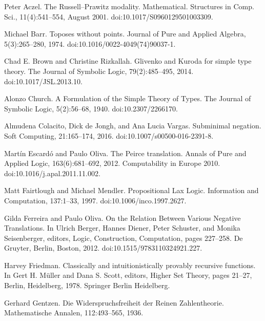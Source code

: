 \documentclass[10pt,a4paper]{article}
\begin{document}
\par\noindent  [1]  Peter Aczel.  The Russell–Prawitz modality.  Mathematical. Structures in Comp. Sci., 11(4):541–554, August 2001.  doi:10.1017/S0960129501003309.  
 
\par\noindent  [2]  Michael Barr.  Toposes without points.  Journal of Pure and Applied Algebra, 5(3):265–280, 1974.  doi:10.1016/0022-4049(74)90037-1.  
 
\par\noindent  [3]  Chad E. Brown and Christine Rizkallah.  Glivenko and Kuroda for simple type theory.  The Journal of Symbolic Logic, 79(2):485–495, 2014.  doi:10.1017/JSL.2013.10.  
 
\par\noindent  [4]  Alonzo Church.  A Formulation of the Simple Theory of Types.  The Journal of Symbolic Logic, 5(2):56–68, 1940.  doi:10.2307/2266170.  
 
\par\noindent  [5]  Almudena Colacito, Dick de Jongh, and Ana Lucia Vargas.  Subminimal negation.  Soft Computing, 21:165–174, 2016.  doi:10.1007/s00500-016-2391-8.  
 
\par\noindent  [6]  Martín Escardó and Paulo Oliva.  The Peirce translation.  Annals of Pure and Applied Logic, 163(6):681–692, 2012.  Computability in Europe 2010.  doi:10.1016/j.apal.2011.11.002.  
 
\par\noindent  [7]  Matt Fairtlough and Michael Mendler.  Propositional Lax Logic.  Information and Computation, 137:1–33, 1997.  doi:10.1006/inco.1997.2627.  
 
\par\noindent  [8]  Gilda Ferreira and Paulo Oliva.  On the Relation Between Various Negative Translations.  In Ulrich Berger, Hannes Diener, Peter Schuster, and Monika Seisenberger, editors, Logic, Construction, Computation, pages 227–258. De Gruyter, Berlin, Boston, 2012.  doi:10.1515/9783110324921.227.  
 
\par\noindent  [9]  Harvey Friedman.  Classically and intuitionistically provably recursive functions.  In Gert H. Müller and Dana S. Scott, editors, Higher Set Theory, pages 21–27, Berlin, Heidelberg, 1978. Springer Berlin Heidelberg.  
 
\par\noindent  [10]  Gerhard Gentzen.  Die Widerspruchsfreiheit der Reinen Zahlentheorie.  Mathematische Annalen, 112:493–565, 1936.  
 
\end{document}
